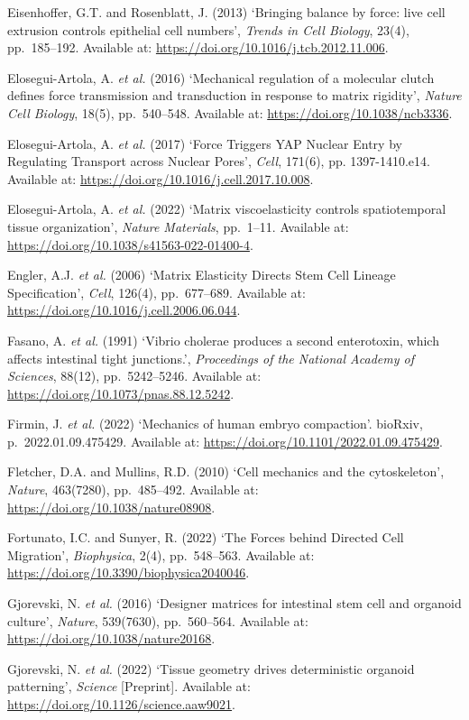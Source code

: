\documentclass[
]{article}
\begin{document}
Eisenhoffer, G.T. and Rosenblatt, J. (2013) `Bringing balance by force:
live cell extrusion controls epithelial cell numbers', \emph{Trends in
Cell Biology}, 23(4), pp.~185--192. Available at:
\url{https://doi.org/10.1016/j.tcb.2012.11.006}.

Elosegui-Artola, A. \emph{et al.} (2016) `Mechanical regulation of a
molecular clutch defines force transmission and transduction in response
to matrix rigidity', \emph{Nature Cell Biology}, 18(5), pp.~540--548.
Available at: \url{https://doi.org/10.1038/ncb3336}.

Elosegui-Artola, A. \emph{et al.} (2017) `Force Triggers YAP Nuclear
Entry by Regulating Transport across Nuclear Pores', \emph{Cell},
171(6), pp. 1397-1410.e14. Available at:
\url{https://doi.org/10.1016/j.cell.2017.10.008}.

Elosegui-Artola, A. \emph{et al.} (2022) `Matrix viscoelasticity
controls spatiotemporal tissue organization', \emph{Nature Materials},
pp.~1--11. Available at:
\url{https://doi.org/10.1038/s41563-022-01400-4}.

Engler, A.J. \emph{et al.} (2006) `Matrix Elasticity Directs Stem Cell
Lineage Specification', \emph{Cell}, 126(4), pp.~677--689. Available at:
\url{https://doi.org/10.1016/j.cell.2006.06.044}.

Fasano, A. \emph{et al.} (1991) `Vibrio cholerae produces a second
enterotoxin, which affects intestinal tight junctions.',
\emph{Proceedings of the National Academy of Sciences}, 88(12),
pp.~5242--5246. Available at:
\url{https://doi.org/10.1073/pnas.88.12.5242}.

Firmin, J. \emph{et al.} (2022) `Mechanics of human embryo compaction'.
bioRxiv, p.~2022.01.09.475429. Available at:
\url{https://doi.org/10.1101/2022.01.09.475429}.

Fletcher, D.A. and Mullins, R.D. (2010) `Cell mechanics and the
cytoskeleton', \emph{Nature}, 463(7280), pp.~485--492. Available at:
\url{https://doi.org/10.1038/nature08908}.

Fortunato, I.C. and Sunyer, R. (2022) `The Forces behind Directed Cell
Migration', \emph{Biophysica}, 2(4), pp.~548--563. Available at:
\url{https://doi.org/10.3390/biophysica2040046}.

Gjorevski, N. \emph{et al.} (2016) `Designer matrices for intestinal
stem cell and organoid culture', \emph{Nature}, 539(7630), pp.~560--564.
Available at: \url{https://doi.org/10.1038/nature20168}.

Gjorevski, N. \emph{et al.} (2022) `Tissue geometry drives deterministic
organoid patterning', \emph{Science} {[}Preprint{]}. Available at:
\url{https://doi.org/10.1126/science.aaw9021}.
\end{document}

